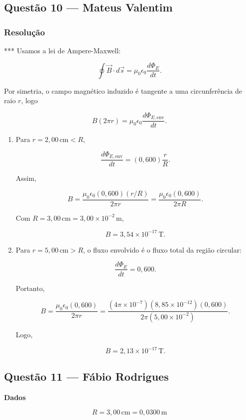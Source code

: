\documentclass[12pt,a4paper]{article}
\begin{document}
\subsection{Questão 10 — Mateus Valentim}
\subsubsection{Resolução}

***
Usamos a lei de Ampere-Maxwell:

\[
\oint \vec{B}\cdot d\vec{s}
=
\mu_0\epsilon_0\frac{d\Phi_E}{dt}.
\]

Por simetria, o campo magnético induzido é tangente a uma circunferência de
raio \(r\), logo

\[
B(2\pi r)=\mu_0\epsilon_0\frac{d\Phi_{E,\text{env}}}{dt}.
\]

\begin{enumerate}
    \item[(a)] Para \(r=2{,}00\,\text{cm}<R\),

    \[
    \frac{d\Phi_{E,\text{env}}}{dt}
    =
    (0{,}600)\frac{r}{R}.
    \]

    Assim,

    \[
    B=
    \frac{\mu_0\epsilon_0(0{,}600)(r/R)}{2\pi r}
    =
    \frac{\mu_0\epsilon_0(0{,}600)}{2\pi R}.
    \]

    Com \(R=3{,}00\,\text{cm}=3{,}00\times 10^{-2}\,\text{m}\),

    \[
    B=3{,}54\times 10^{-17}\,\text{T}.
    \]

    \item[(b)] Para \(r=5{,}00\,\text{cm}>R\), o fluxo envolvido é o fluxo
    total da região circular:

    \[
    \frac{d\Phi_E}{dt}=0{,}600.
    \]

    Portanto,

    \[
    B=
    \frac{\mu_0\epsilon_0(0{,}600)}{2\pi r}
    =
    \frac{(4\pi\times 10^{-7})(8{,}85\times 10^{-12})(0{,}600)}
    {2\pi(5{,}00\times 10^{-2})}.
    \]

    Logo,

    \[
    B=2{,}13\times 10^{-17}\,\text{T}.
    \]
\end{enumerate}

\subsection{Questão 11 — Fábio Rodrigues}
\textbf{Dados}

\[
R = 3,00\,\text{cm} = 0,0300\,\text{m}
\]
\end{document}
